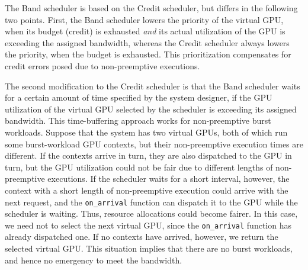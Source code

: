 The Band scheduler is based on the Credit scheduler, but differs in the
following two points.
First, the Band scheduler lowers the priority of the virtual GPU, when
its budget (credit) is exhausted \textit{and} its actual utilization of
the GPU is exceeding the assigned bandwidth, whereas the Credit
scheduler always lowers the priority, when the budget is exhausted.
This prioritization compensates for credit errors posed due to
non-preemptive executions.

The second modification to the Credit scheduler is that the Band
scheduler waits for a certain amount of time specified by the system
designer, if the GPU utilization of the virtual GPU selected
by the scheduler is exceeding its assigned bandwidth.
This time-buffering approach works for non-preemptive burst workloads.
Suppose that the system has two virtual GPUs, both of which run some
burst-workload GPU contexts, but their non-preemptive execution times
are different.
If the contexts arrive in turn, they are also dispatched to the GPU in
turn, but the GPU utilization could not be fair due to different lengths
of non-preemptive executions.
If the scheduler waits for a short interval, however, the context with a
short length of non-preemptive execution could arrive with the next
request, and the \texttt{on\_arrival} function can dispatch it to the
GPU while the scheduler is waiting.
Thus, resource allocations could become fairer.
In this case, we need not to select the next virtual GPU, since the
\texttt{on\_arrival} function has already dispatched one.
If no contexts have arrived, however, we return the selected virtual GPU.
This situation implies that there are no burst workloads, and hence no
emergency to meet the bandwidth.
